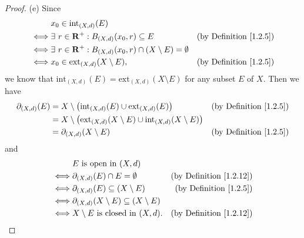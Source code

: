 \begin{proof}{(e)}
    Since
    \begin{align*}
             & x_0 \in \text{int}_{(X, d)}(E)                                                                                 \\
        \iff & \exists\ r \in \mathbf{R}^+ : B_{(X, d)}(x_0, r) \subseteq E                      & \text{(by Definition \ref{1.2.5})} \\
        \iff & \exists\ r \in \mathbf{R}^+ : B_{(X, d)}(x_0, r) \cap (X \setminus E) = \emptyset                                      \\
        \iff & x_0 \in \text{ext}_{(X, d)}(X \setminus E),                               & \text{(by Definition \ref{1.2.5})}
    \end{align*}
    we know that \(\text{int}_{(X, d)}(E) = \text{ext}_{(X, d)}(X \setminus E)\) for any subset \(E\) of \(X\).
    Then we have
    \begin{align*}
        \partial_{(X, d)}(E) & = X \setminus \big(\text{int}_{(X, d)}(E) \cup \text{ext}_{(X, d)}(E)\big)                         & \text{(by Definition \ref{1.2.5})} \\
                             & = X \setminus \big(\text{ext}_{(X, d)}(X \setminus E) \cup \text{int}_{(X, d)}(X \setminus E)\big)                                      \\
                             & = \partial_{(X, d)}(X \setminus E)                                                                 & \text{(by Definition \ref{1.2.5})}
    \end{align*}
    and
    \begin{align*}
             & E \text{ is open in } (X, d)                                                                     \\
        \iff & \partial_{(X, d)}(E) \cap E = \emptyset                    & \text{(by Definition \ref{1.2.12})} \\
        \iff & \partial_{(X, d)}(E) \subseteq (X \setminus E)             & \text{(by Definition \ref{1.2.5})}  \\
        \iff & \partial_{(X, d)}(X \setminus E) \subseteq (X \setminus E)                                       \\
        \iff & X \setminus E \text{ is closed in } (X, d).                & \text{(by Definition \ref{1.2.12})}
    \end{align*}
\end{proof}

